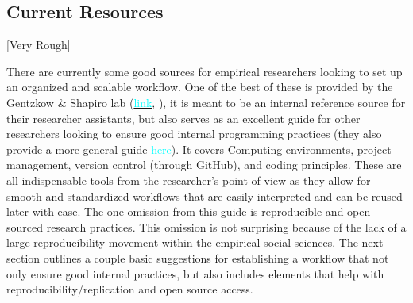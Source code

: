 \documentclass[12pt]{article}
\begin{document}
\subsection{Current Resources}
\textcolor{BrickRed}{[Very Rough]}

There are currently some good sources for empirical researchers looking to set up an organized and scalable workflow. One of the best of these is provided by the Gentzkow \& Shapiro lab (\href{https://github.com/gslab-econ/ra-manual/wiki/Getting-Started}{\textcolor{cyan}{link}}, \cite{GSlab}), it is meant to be an internal reference source for their researcher assistants, but also serves as an excellent guide for other researchers looking to ensure good internal programming practices (they also provide a more general guide \href{https://web.stanford.edu/~gentzkow/research/CodeAndData.xhtml#magicparlabel-20}{\textcolor{cyan}{here}}). It covers Computing environments, project management, version control (through GitHub), and coding principles. These are all indispensable tools from the researcher's point of view as they allow for smooth and standardized workflows that are easily interpreted and can be reused later with ease. The one omission from this guide is reproducible and open sourced research practices. This omission is not surprising because of the lack of a large reproducibility movement within the empirical social sciences. The next section outlines a couple basic suggestions for establishing a workflow that not only ensure good internal practices, but also includes elements that help with reproducibility/replication and open source access.

\end{document}
